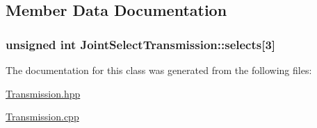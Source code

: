 \subsection{Member Data Documentation}
\subsubsection[{\texorpdfstring{selects}{selects}}]{\setlength{\rightskip}{0pt plus 5cm}unsigned int Joint\+Select\+Transmission\+::selects\mbox{[}3\mbox{]}\hspace{0.3cm}{\ttfamily [protected]}}\hypertarget{classJointSelectTransmission_ad36b0b411323435da1eeb48de88f75e6}{}\label{classJointSelectTransmission_ad36b0b411323435da1eeb48de88f75e6}


The documentation for this class was generated from the following files\+:\begin{DoxyCompactItemize}
\item 
\hyperlink{Transmission_8hpp}{Transmission.\+hpp}\item 
\hyperlink{Transmission_8cpp}{Transmission.\+cpp}\end{DoxyCompactItemize}
